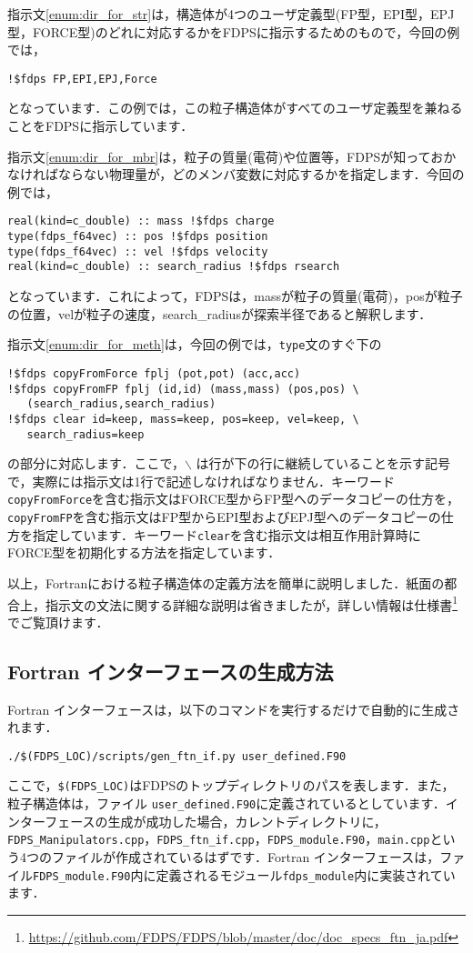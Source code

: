 \documentclass[twocolumn,10pt]{jarticle}
\begin{document}
指示文\ref{enum:dir_for_str}は，構造体が4つのユーザ定義型(FP型，EPI型，EPJ型，FORCE型)のどれに対応するかをFDPSに指示するためのもので，今回の例では，
{\footnotesize
\begin{verbatim}
!$fdps FP,EPI,EPJ,Force
\end{verbatim}
}\noindent
となっています．この例では，この粒子構造体がすべてのユーザ定義型を兼ねることをFDPSに指示しています．

指示文\ref{enum:dir_for_mbr}は，粒子の質量(電荷)や位置等，FDPSが知っておかなければならない物理量が，どのメンバ変数に対応するかを指定します．今回の例では，
{\footnotesize
\begin{verbatim}
real(kind=c_double) :: mass !$fdps charge
type(fdps_f64vec) :: pos !$fdps position
type(fdps_f64vec) :: vel !$fdps velocity
real(kind=c_double) :: search_radius !$fdps rsearch  
\end{verbatim}
}\noindent
となっています．これによって，FDPSは，massが粒子の質量(電荷)，posが粒子の位置，velが粒子の速度，search\_radiusが探索半径であると解釈します．

指示文\ref{enum:dir_for_meth}は，今回の例では，\texttt{type}文のすぐ下の
{\footnotesize
\begin{verbatim}
!$fdps copyFromForce fplj (pot,pot) (acc,acc)
!$fdps copyFromFP fplj (id,id) (mass,mass) (pos,pos) \
   (search_radius,search_radius)
!$fdps clear id=keep, mass=keep, pos=keep, vel=keep, \
   search_radius=keep
\end{verbatim}
}\noindent
の部分に対応します．ここで，$\backslash$ は行が下の行に継続していることを示す記号で，実際には指示文は1行で記述しなければなりません．キーワード\texttt{copyFromForce}を含む指示文はFORCE型からFP型へのデータコピーの仕方を，\texttt{copyFromFP}を含む指示文はFP型からEPI型およびEPJ型へのデータコピーの仕方を指定しています．キーワード\texttt{clear}を含む指示文は相互作用計算時にFORCE型を初期化する方法を指定しています．

以上，Fortranにおける粒子構造体の定義方法を簡単に説明しました．紙面の都合上，指示文の文法に関する詳細な説明は省きましたが，詳しい情報は仕様書\footnote{\url{https://github.com/FDPS/FDPS/blob/master/doc/doc_specs_ftn_ja.pdf}}でご覧頂けます．

\subsection{Fortran インターフェースの生成方法}\label{subsec:how_to_gen_if}
Fortran インターフェースは，以下のコマンドを実行するだけで自動的に生成されます．
{\footnotesize
\begin{verbatim}
./$(FDPS_LOC)/scripts/gen_ftn_if.py user_defined.F90
\end{verbatim}
}\noindent
ここで，\texttt{\$(FDPS\_LOC)}はFDPSのトップディレクトリのパスを表します．また，粒子構造体は，ファイル \texttt{user\_defined.F90}に定義されているとしています．インターフェースの生成が成功した場合，カレントディレクトリに，\texttt{FDPS\_Manipulators.cpp}，\texttt{FDPS\_ftn\_if.cpp}，\texttt{FDPS\_module.F90}，\texttt{main.cpp}という4つのファイルが作成されているはずです．Fortran インターフェースは，ファイル\texttt{FDPS\_module.F90}内に定義されるモジュール\texttt{fdps\_module}内に実装されています．
\end{document}
